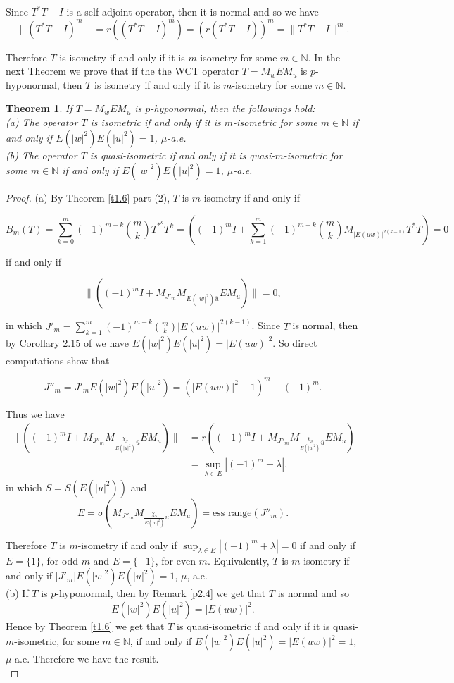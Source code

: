 \documentclass{amsart}
\newtheorem{thm}{Theorem}[section]
\theoremstyle{definition}\newtheorem{defn}[thm]{Definition}
\theoremstyle{remark}
\numberwithin{equation}{section}
\begin{document}
 Since $T^*T-I$ is a self adjoint operator, then it is normal and so we have 
  $$\|(T^*T-I)^m\|=r((T^*T-I)^m)=(r(T^*T-I))^m=\|T^*T-I\|^m.$$
  
  Therefore $T$ is isometry if and only if it is $m$-isometry for some $m\in \mathbb{N}$. In the next Theorem we prove that if the the WCT operator $T=M_wEM_u$ is $p$-hyponormal, then $T$ is isometry if and only if it is $m$-isometry for some $m\in \mathbb{N}$.
\begin{thm}
If $T=M_wEM_u$ is $p$-hyponormal, then the followings hold:\\

(a) The operator $T$ is isometric if and only if it is $m$-isometric for some $m\in \mathbb{N}$ if and only if $E(|w|^2)E(|u|^2)=1$, $\mu$-a.e.\\ 

(b) The operator $T$ is quasi-isometric if and only if it is quasi-$m$-isometric for some $m\in \mathbb{N}$ if and only if $E(|w|^2)E(|u|^2)=1$, $\mu$-a.e.\\ 

\end{thm}
\begin{proof}
(a) By Theorem \ref{t1.6} part (2), $T$ is $m$-isometry if and only if

$$B_m(T)=\sum_{k=0}^{m}(-1)^{m-k}\binom{m}{k}T^{*^{k}}T^{k}=((-1)^mI+\sum_{k=1}^{m}(-1)^{m-k}\binom{m}{k}M_{|E(uw)|^{2(k-1)}}T^*T)=0$$

if and only if
 
$$\|((-1)^mI+M_{J'_m}M_{E(|w|^2)\bar{u}}EM_u)\|=0,$$ 

in which  $J'_m=\sum_{k=1}^{m}(-1)^{m-k}\binom{m}{k}|E(uw)|^{2(k-1)}$. Since $T$ is normal, then by Corollary 2.15 of \cite{emj} we have $E(|w|^2)E(|u|^2)=|E(uw)|^2$. So direct computations show that 

$$J''_m=J'_mE(|w|^2)E(|u|^2)=(|E(uw)|^2-1)^m-(-1)^m.$$

 Thus we have
\begin{align*}
\|((-1)^mI+M_{J''_m}M_{\frac{\chi_S}{E(|u|^2)}\bar{u}}EM_u)\|&=r((-1)^mI+M_{J''_m}M_{\frac{\chi_S}{E(|u|^2)}\bar{u}}EM_u)\\
&=\sup_{\lambda\in E}|(-1)^m+\lambda|,
\end{align*}
 in which $S=S(E(|u|^2))$ and
  $$E=\sigma(M_{J''_m}M_{\frac{\chi_S}{E(|u|^2)}\bar{u}}EM_u)=\text{ess \ range}(J''_m).$$
 
 Therefore $T$ is $m$-isometry if and only if $\sup_{\lambda\in E}|(-1)^m+\lambda|=0$ if and only if $E=\{1\}$, for odd $m$ and $E=\{-1\}$, for even $m$. Equivalently, $T$ is $m$-isometry if and only if $|J'_m|E(|w|^2)E(|u|^2)=1$, $\mu$, a.e.\\
 
 (b) If $T$ is $p$-hyponormal, then by Remark \ref{p2.4} we get that $T$ is normal and so 
 $$E(|w|^2)E(|u|^2)=|E(uw)|^2.$$
 Hence by Theorem \ref{t1.6} we get that $T$ is quasi-isometric if and only if it is quasi-$m$-isometric, for some $m\in \mathbb{N}$, if and only if $E(|w|^2)E(|u|^2)=|E(uw)|^2=1$, $\mu$-a.e. Therefore we have the result.\\
 
 
\end{proof}
\end{document}
